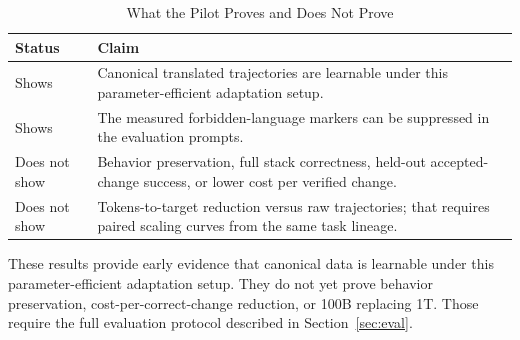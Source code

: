 \begin{table}[t]
\caption{What the Pilot Proves and Does Not Prove}
\label{tab:pilotlimits}
\centering
\footnotesize
\begin{tabularx}{\columnwidth}{p{}X}
\toprule
Status & Claim \\
\midrule
Shows & Canonical translated trajectories are learnable under this parameter-efficient adaptation setup. \\
Shows & The measured forbidden-language markers can be suppressed in the evaluation prompts. \\
Does not show & Behavior preservation, full stack correctness, held-out accepted-change success, or lower cost per verified change. \\
Does not show & Tokens-to-target reduction versus raw trajectories; that requires paired scaling curves from the same task lineage. \\
\bottomrule
\end{tabularx}
\end{table}

These results provide early evidence that canonical data is learnable under this parameter-efficient adaptation setup. They do not yet prove behavior preservation, cost-per-correct-change reduction, or 100B replacing 1T. Those require the full evaluation protocol described in Section~\ref{sec:eval}.

